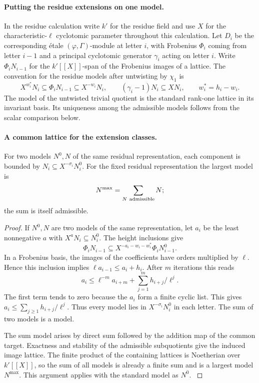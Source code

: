 \paragraph{Putting the residue extensions on one model.}
In the residue calculation write \(k'\) for the residue field and
use \(X\) for the characteristic-\(\ell\) cyclotomic parameter
throughout this calculation. Let \(D_i\) be the corresponding
étale \((\varphi,\Gamma)\)-module at letter \(i\), with Frobenius
\(\Phi_i\) coming from letter \(i-1\) and a principal cyclotomic
generator \(\gamma_i\) acting on letter \(i\).
Write \(\Phi_i N_{i-1}\) for the \(k'[[X]]\)-span of the
Frobenius images of a lattice. The convention for the residue
models after untwisting by \(\chi_1\) is
\[
 X^{w_i^*}N_i\subseteq \Phi_i N_{i-1}
       \subseteq X^{-w_i}N_i,\qquad
 (\gamma_i-1)N_i\subseteq XN_i,\qquad w_i^*=h_i-w_i.
\]
The model of the untwisted trivial quotient is the standard
rank-one lattice in its invariant basis. Its uniqueness among
the admissible models follows from the scalar comparison below.



\paragraph{A common lattice for the extension classes.}
\begin{lemma}
\label{lem:largest-compatible-residue-model}
For two models \(N^0,N\) of the same residual representation,
each component is bounded by \(N_i\subseteq X^{-\sigma_i}N_i^0\). For the fixed residual representation the largest model is
\[
 N^{\max}=\sum_{N\ {\rm admissible}}N;
\]
the sum is itself admissible.
\end{lemma}

\begin{proof}
If \(N^0,N\) are two models of the same representation, let \(a_i\)
be the least nonnegative \(a\) with \(X^a N_i\subseteq N_i^0\).
The height inclusions give
\[
 \Phi_i N_{i-1}\subseteq X^{-a_i-w_i-w_i^*}\Phi_i N^0_{i-1}.
\]
In a Frobenius basis, the images of the coefficients have orders
multiplied by \(\ell\). Hence this inclusion implies
\(\ell a_{i-1}\le a_i+h_i\).
After \(m\) iterations this reads
\[
        a_i\le \ell^{-m}a_{i+m}
                 +\sum_{j=1}^m h_{i+j}/\ell^j .
\]
The first term tends to zero because the \(a_i\) form a
finite cyclic list. This gives \(a_i\le\sum_{j\ge1}h_{i+j}/\ell^j\).
Thus every model lies in \(X^{-\sigma_i}N_i^0\) in each letter.
The sum of two models is a model.

The sum model arises by direct sum
followed by the addition map of the common target. Exactness
and stability of the admissible subquotients give the induced
image lattice. The finite product of the containing lattices
is Noetherian over \(k'[[X]]\), so the sum of all models is
already a finite sum and is a largest model \(N^{\max}\).
This argument applies with the standard model as \(N^0\).
\label{cor:residue-model-length-1}
\end{proof}

